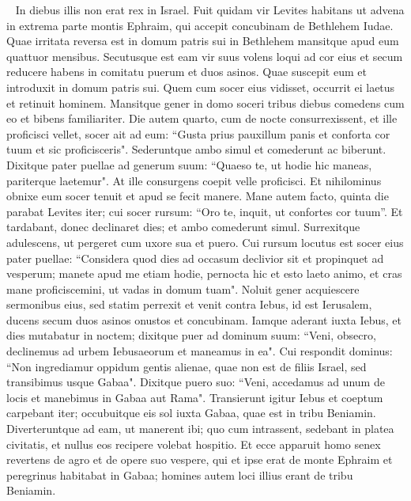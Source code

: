 \begin{biblechapter}    In diebus illis non erat rex in Israel. 
\verse Fuit quidam vir Levites habitans ut advena in extrema parte montis Ephraim, qui accepit concubinam de Bethlehem Iudae. 
\verse Quae irritata reversa est in domum patris sui in Bethlehem mansitque apud eum quattuor mensibus. 
\verse Secutusque est eam vir suus volens loqui ad cor eius et secum reducere habens in comitatu puerum et duos asinos. Quae suscepit eum et introduxit in domum patris sui. Quem cum socer eius vidisset, occurrit ei laetus 
\verse et retinuit hominem. Mansitque gener in domo soceri tribus diebus comedens cum eo et bibens familiariter. 
\verse Die autem quarto, cum de nocte consurrexissent, et ille proficisci vellet, socer ait ad eum: “Gusta prius pauxillum panis et conforta cor tuum et sic proficisceris". 
\verse Sederuntque ambo simul et comederunt ac biberunt. Dixitque pater puellae ad generum suum: “Quaeso te, ut hodie hic maneas, pariterque laetemur". 
\verse At ille consurgens coepit velle proficisci. Et nihilominus obnixe eum socer tenuit et apud se fecit manere. 
\verse Mane autem facto, quinta die parabat Levites iter; cui socer rursum: “Oro te, inquit, ut confortes cor tuum”. Et tardabant, donec declinaret dies; et ambo comederunt simul. 
\verse Surrexitque adulescens, ut pergeret cum uxore sua et puero. Cui rursum locutus est socer eius pater puellae: “Considera quod dies ad occasum declivior sit et propinquet ad vesperum; manete apud me etiam hodie, pernocta hic et esto laeto animo, et cras mane proficiscemini, ut vadas in domum tuam". 
\verse Noluit gener acquiescere sermonibus eius, sed statim perrexit et venit contra Iebus, id est Ierusalem, ducens secum duos asinos onustos et concubinam. 
\verse Iamque aderant iuxta Iebus, et dies mutabatur in noctem; dixitque puer ad dominum suum: “Veni, obsecro, declinemus ad urbem Iebusaeorum et maneamus in ea". 
\verse Cui respondit dominus: “Non ingrediamur oppidum gentis alienae, quae non est de filiis Israel, sed transibimus usque Gabaa". 
\verse Dixitque puero suo: “Veni, accedamus ad unum de locis et manebimus in Gabaa aut Rama". 
\verse Transierunt igitur Iebus et coeptum carpebant iter; occubuitque eis sol iuxta Gabaa, quae est in tribu Beniamin. 
\verse Diverteruntque ad eam, ut manerent ibi; quo cum intrassent, sedebant in platea civitatis, et nullus eos recipere volebat hospitio. 
\verse Et ecce apparuit homo senex revertens de agro et de opere suo vespere, qui et ipse erat de monte Ephraim et peregrinus habitabat in Gabaa; homines autem loci illius erant de tribu Beniamin. 

\end{biblechapter}
